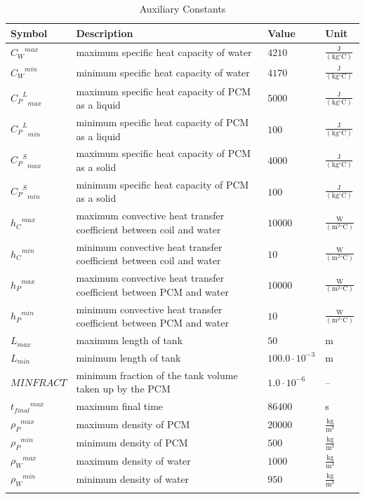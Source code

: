 \documentclass[12pt]{article}
\begin{document}
\begin{longtabu}{l X[l] l l}
\toprule
Symbol & Description & Value & Unit
\\
\midrule
${{C_{W}}^{max}}$ & maximum specific heat capacity of water & $4210$ & $\frac{\text{J}}{(\text{kg}{}^{\circ}\text{C})}$
\\
${{C_{W}}^{min}}$ & minimum specific heat capacity of water & $4170$ & $\frac{\text{J}}{(\text{kg}{}^{\circ}\text{C})}$
\\
${{{C_{P}}^{L}}_{max}}$ & maximum specific heat capacity of PCM as a liquid & $5000$ & $\frac{\text{J}}{(\text{kg}{}^{\circ}\text{C})}$
\\
${{{C_{P}}^{L}}_{min}}$ & minimum specific heat capacity of PCM as a liquid & $100$ & $\frac{\text{J}}{(\text{kg}{}^{\circ}\text{C})}$
\\
${{{C_{P}}^{S}}_{max}}$ & maximum specific heat capacity of PCM as a solid & $4000$ & $\frac{\text{J}}{(\text{kg}{}^{\circ}\text{C})}$
\\
${{{C_{P}}^{S}}_{min}}$ & minimum specific heat capacity of PCM as a solid & $100$ & $\frac{\text{J}}{(\text{kg}{}^{\circ}\text{C})}$
\\
${{h_{C}}^{max}}$ & maximum convective heat transfer coefficient between coil and water & $10000$ & $\frac{\text{W}}{(\text{m}^{2}{}^{\circ}\text{C})}$
\\
${{h_{C}}^{min}}$ & minimum convective heat transfer coefficient between coil and water & $10$ & $\frac{\text{W}}{(\text{m}^{2}{}^{\circ}\text{C})}$
\\
${{h_{P}}^{max}}$ & maximum convective heat transfer coefficient between PCM and water & $10000$ & $\frac{\text{W}}{(\text{m}^{2}{}^{\circ}\text{C})}$
\\
${{h_{P}}^{min}}$ & minimum convective heat transfer coefficient between PCM and water & $10$ & $\frac{\text{W}}{(\text{m}^{2}{}^{\circ}\text{C})}$
\\
${L_{max}}$ & maximum length of tank & $50$ & m
\\
${L_{min}}$ & minimum length of tank & $100.0\cdot{}10^{-3}$ & m
\\
$MINFRACT$ & minimum fraction of the tank volume taken up by the PCM & $1.0\cdot{}10^{-6}$ & --
\\
${{t_{final}}^{max}}$ & maximum final time & $86400$ & s
\\
${{ρ_{P}}^{max}}$ & maximum density of PCM & $20000$ & $\frac{\text{kg}}{\text{m}^{3}}$
\\
${{ρ_{P}}^{min}}$ & minimum density of PCM & $500$ & $\frac{\text{kg}}{\text{m}^{3}}$
\\
${{ρ_{W}}^{max}}$ & maximum density of water & $1000$ & $\frac{\text{kg}}{\text{m}^{3}}$
\\
${{ρ_{W}}^{min}}$ & minimum density of water & $950$ & $\frac{\text{kg}}{\text{m}^{3}}$
\\
\bottomrule
\caption{Auxiliary Constants}
\label{Table:TAuxConsts}
\end{longtabu}
\end{document}

